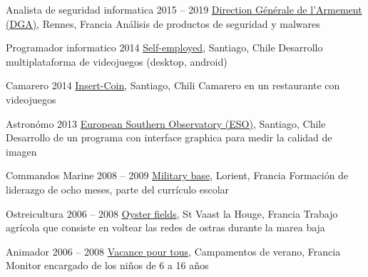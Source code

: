 \begin{joblist}[13.2][7.8][3.5]


\item[Analista de seguridad informatica]{2015 -- 2019}
	{
  \href{http://www.defense.gouv.fr/dga/}{Direction Générale de l'Armement (DGA)}, Rennes, Francia
	}
	{Análisis de productos de seguridad y malwares}


\item[Programador informatico]{2014}
	{
	\href{https://play.google.com/store/apps/developer?id=tinmarino&hl=en}{Self-employed}, Santiago, Chile
	}
	{Desarrollo multiplataforma de videojuegos (desktop, android)}


\item[Camarero]{2014}
	{
	\href{http://www.insertcoin.cl/}{Insert-Coin}, Santiago, Chili
	}
	{Camarero en un restaurante con videojuegos}


\item[Astronómo]{2013}
	{
	\href{http://www.eso.org/public/}{European Southern Observatory (ESO)}, Santiago, Chile
	}
	{Desarrollo de un programa con interface graphica para medir la calidad de imagen}

	
\item[Commandos Marine]{2008 -- 2009}
	{
	\href{http://www.defense.gouv.fr/marine/organisation/forces/fusiliers-marins-et-commandos/force-maritime-des-fusiliers-marins-et-commandos}{Military base}, Lorient, Francia
	}
	{Formación de liderazgo de ocho meses, parte del currículo escolar}


\item[Ostreicultura]{2006 -- 2008}
	{
	\href{http://huitresdesaintvaast.fr/}{Oyster fields}, St Vaast la Houge, Francia
	}
	{Trabajo agrícola que consiste en voltear las redes de ostras durante la marea baja}


\item[Animador]{2006 -- 2008}
	{
	\href{http://www.vacances-pour-tous.org/}{Vacance pour tous}, Campamentos de verano, Francia
	}
	{Monitor encargado de los niños de 6 a 16 años}
	
	
\end{joblist}


